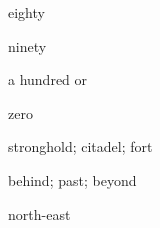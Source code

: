 \documentclass[avery5371,grid,frame]{flashcards}
\begin{document}
\begin{flashcard}{\LARGE eighty}
\LARGE {}
\end{flashcard}
\begin{flashcard}{\LARGE ninety}
\LARGE {}
\end{flashcard}
\begin{flashcard}{\LARGE a hundred}
\LARGE {} or 
\end{flashcard}
\begin{flashcard}{\LARGE zero}
\LARGE {}
\end{flashcard}
\begin{flashcard}{\LARGE stronghold; citadel; fort}
\LARGE {}
\end{flashcard}
\begin{flashcard}{\LARGE behind; past; beyond}
\LARGE {}
\end{flashcard}
\begin{flashcard}{\LARGE north-east}
\LARGE {}
\end{flashcard}
\end{document}
